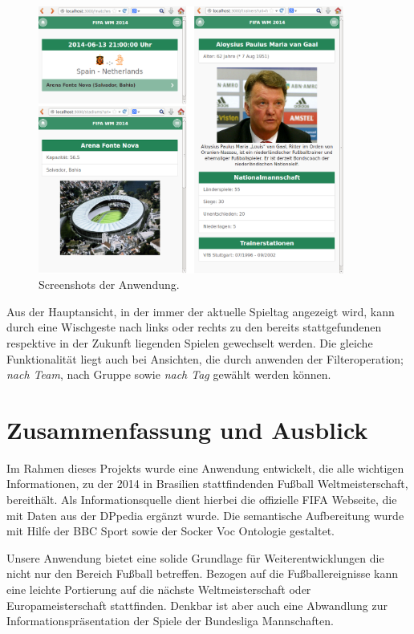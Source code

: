 \documentclass[runningheads,a4paper]{llncs}
\begin{document}
       
\begin{figure}
\centering
\includegraphics[height=8.8cm]{screenshots}
\caption{Screenshots der Anwendung.}
\label{fig:screenshots}
\end{figure}

Aus der Hauptansicht, in der immer der aktuelle Spieltag angezeigt wird, kann durch eine Wischgeste nach links oder rechts zu den bereits stattgefundenen respektive in der Zukunft liegenden Spielen gewechselt werden. Die gleiche Funktionalität liegt auch bei Ansichten, die durch anwenden der Filteroperation; \textit{nach Team}, nach Gruppe sowie \textit{nach Tag} gewählt werden können.

\newpage

\section{Zusammenfassung und Ausblick}

Im Rahmen dieses Projekts wurde eine Anwendung entwickelt, die alle wichtigen Informationen, zu der 2014 in Brasilien stattfindenden Fußball Weltmeisterschaft, bereithält. Als Informationsquelle dient hierbei die offizielle FIFA Webseite, die mit Daten aus der DPpedia ergänzt wurde. Die semantische Aufbereitung wurde mit Hilfe der BBC Sport sowie der Socker Voc Ontologie gestaltet.  

Unsere Anwendung bietet eine solide Grundlage für Weiterentwicklungen die nicht nur den Bereich Fußball betreffen. Bezogen auf die Fußballereignisse kann eine leichte Portierung auf die nächste Weltmeisterschaft oder Europameisterschaft stattfinden. Denkbar ist aber auch eine Abwandlung zur Informationspräsentation der Spiele der Bundesliga Mannschaften. 
\end{document}
